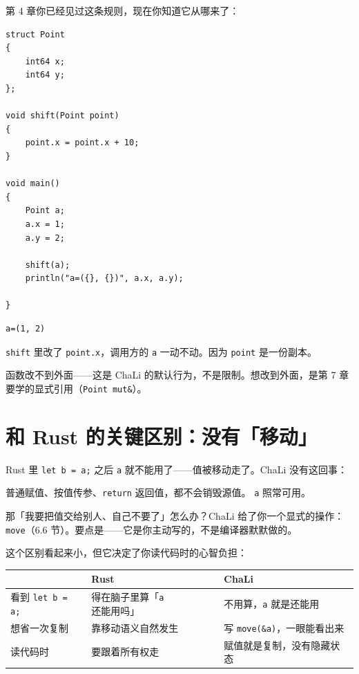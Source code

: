 第 4 章你已经见过这条规则，现在你知道它从哪来了：

\par
\medskip
\begin{lstlisting}[style=chali]
struct Point
{
    int64 x;
    int64 y;
};

void shift(Point point)
{
    point.x = point.x + 10;
}

void main()
{
    Point a;
    a.x = 1;
    a.y = 2;

    shift(a);
    println("a=({}, {})", a.x, a.y);

}
\end{lstlisting}
\par
\medskip

\par
\medskip
\begin{lstlisting}[style=out]
a=(1, 2)
\end{lstlisting}
\par
\medskip

\texttt{shift} 里改了 \texttt{point.\allowbreak{}x}，调用方的 \texttt{a} 一动不动。因为 \texttt{point} 是一份副本。

函数改不到外面——这是 ChaLi 的默认行为，不是限制。想改到外面，是第 7 章 要学的显式引用（\texttt{Point mut\&}）。

\section{和 Rust 的关键区别：没有「移动」}

Rust 里 \texttt{let b =\allowbreak{} a;} 之后 \texttt{a} 就不能用了——值被移动走了。ChaLi 没有这回事：

普通赋值、按值传参、\texttt{return} 返回值，都不会销毁源值。 \texttt{a} 照常可用。

那「我要把值交给别人、自己不要了」怎么办？ChaLi 给了你一个显式的操作：\texttt{move}（6.6 节）。要点是——它是你主动写的，不是编译器默默做的。

这个区别看起来小，但它决定了你读代码时的心智负担：

\begin{center}
\begin{tabular}{lll}
\toprule
 & Rust & ChaLi \\
\midrule
看到 \texttt{let b =\allowbreak{} a;} & 得在脑子里算「\texttt{a} 还能用吗」 & 不用算，\texttt{a} 就是还能用 \\
想省一次复制 & 靠移动语义自然发生 & 写 \texttt{move(\allowbreak{}\&a)\allowbreak{}}，一眼能看出来 \\
读代码时 & 要跟着所有权走 & 赋值就是复制，没有隐藏状态 \\
\bottomrule
\end{tabular}
\end{center}

